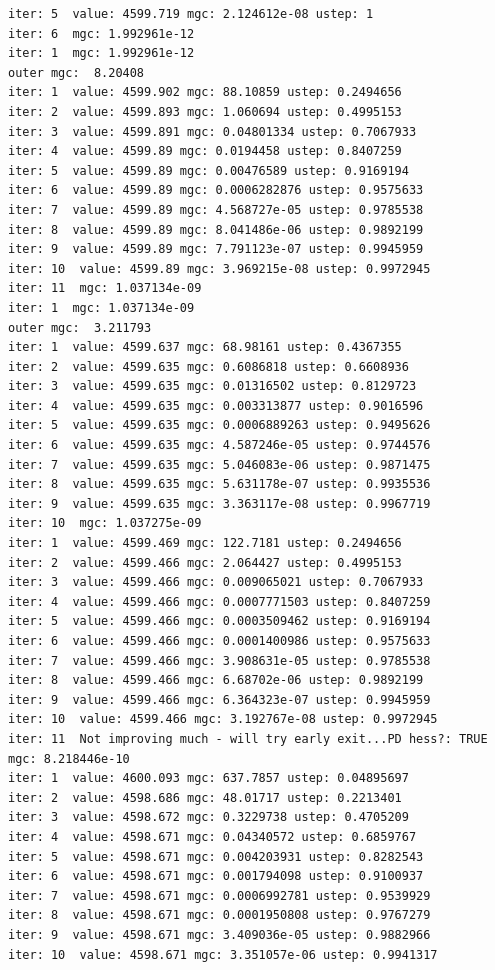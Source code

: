 \documentclass[
  letterpaper,
  DIV=11,
  numbers=noendperiod]{scrartcl}
\begin{document}
\begin{verbatim}
iter: 5  value: 4599.719 mgc: 2.124612e-08 ustep: 1 
iter: 6  mgc: 1.992961e-12 
iter: 1  mgc: 1.992961e-12 
outer mgc:  8.20408 
iter: 1  value: 4599.902 mgc: 88.10859 ustep: 0.2494656 
iter: 2  value: 4599.893 mgc: 1.060694 ustep: 0.4995153 
iter: 3  value: 4599.891 mgc: 0.04801334 ustep: 0.7067933 
iter: 4  value: 4599.89 mgc: 0.0194458 ustep: 0.8407259 
iter: 5  value: 4599.89 mgc: 0.00476589 ustep: 0.9169194 
iter: 6  value: 4599.89 mgc: 0.0006282876 ustep: 0.9575633 
iter: 7  value: 4599.89 mgc: 4.568727e-05 ustep: 0.9785538 
iter: 8  value: 4599.89 mgc: 8.041486e-06 ustep: 0.9892199 
iter: 9  value: 4599.89 mgc: 7.791123e-07 ustep: 0.9945959 
iter: 10  value: 4599.89 mgc: 3.969215e-08 ustep: 0.9972945 
iter: 11  mgc: 1.037134e-09 
iter: 1  mgc: 1.037134e-09 
outer mgc:  3.211793 
iter: 1  value: 4599.637 mgc: 68.98161 ustep: 0.4367355 
iter: 2  value: 4599.635 mgc: 0.6086818 ustep: 0.6608936 
iter: 3  value: 4599.635 mgc: 0.01316502 ustep: 0.8129723 
iter: 4  value: 4599.635 mgc: 0.003313877 ustep: 0.9016596 
iter: 5  value: 4599.635 mgc: 0.0006889263 ustep: 0.9495626 
iter: 6  value: 4599.635 mgc: 4.587246e-05 ustep: 0.9744576 
iter: 7  value: 4599.635 mgc: 5.046083e-06 ustep: 0.9871475 
iter: 8  value: 4599.635 mgc: 5.631178e-07 ustep: 0.9935536 
iter: 9  value: 4599.635 mgc: 3.363117e-08 ustep: 0.9967719 
iter: 10  mgc: 1.037275e-09 
iter: 1  value: 4599.469 mgc: 122.7181 ustep: 0.2494656 
iter: 2  value: 4599.466 mgc: 2.064427 ustep: 0.4995153 
iter: 3  value: 4599.466 mgc: 0.009065021 ustep: 0.7067933 
iter: 4  value: 4599.466 mgc: 0.0007771503 ustep: 0.8407259 
iter: 5  value: 4599.466 mgc: 0.0003509462 ustep: 0.9169194 
iter: 6  value: 4599.466 mgc: 0.0001400986 ustep: 0.9575633 
iter: 7  value: 4599.466 mgc: 3.908631e-05 ustep: 0.9785538 
iter: 8  value: 4599.466 mgc: 6.68702e-06 ustep: 0.9892199 
iter: 9  value: 4599.466 mgc: 6.364323e-07 ustep: 0.9945959 
iter: 10  value: 4599.466 mgc: 3.192767e-08 ustep: 0.9972945 
iter: 11  Not improving much - will try early exit...PD hess?: TRUE 
mgc: 8.218446e-10 
iter: 1  value: 4600.093 mgc: 637.7857 ustep: 0.04895697 
iter: 2  value: 4598.686 mgc: 48.01717 ustep: 0.2213401 
iter: 3  value: 4598.672 mgc: 0.3229738 ustep: 0.4705209 
iter: 4  value: 4598.671 mgc: 0.04340572 ustep: 0.6859767 
iter: 5  value: 4598.671 mgc: 0.004203931 ustep: 0.8282543 
iter: 6  value: 4598.671 mgc: 0.001794098 ustep: 0.9100937 
iter: 7  value: 4598.671 mgc: 0.0006992781 ustep: 0.9539929 
iter: 8  value: 4598.671 mgc: 0.0001950808 ustep: 0.9767279 
iter: 9  value: 4598.671 mgc: 3.409036e-05 ustep: 0.9882966 
iter: 10  value: 4598.671 mgc: 3.351057e-06 ustep: 0.9941317 

\end{verbatim}
\end{document}
